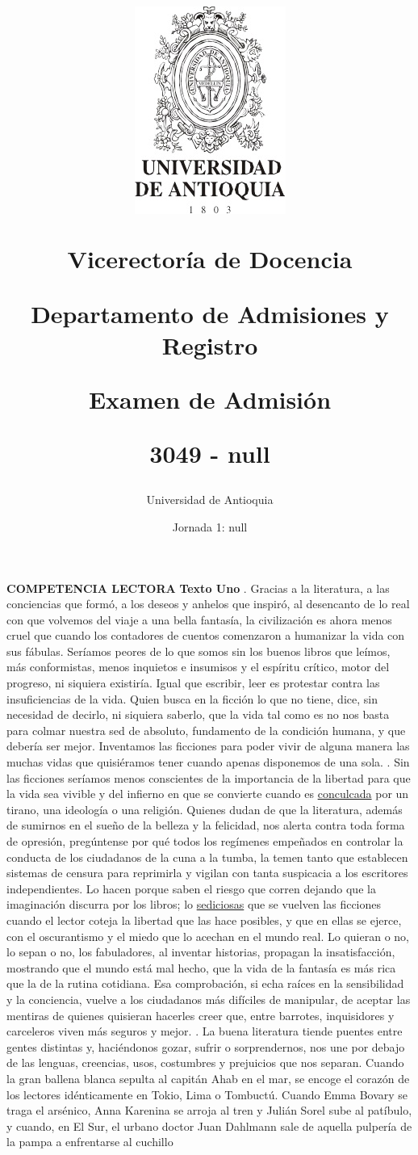 \documentclass[a4paper,12pt]{article}
\title{ 
\begin{minipage}{12cm} 
\centerline {\includegraphics{../../escudo.jpg}} 
\begin{center}Vicerector\'ia de Docencia\end{center}Departamento de Admisiones y Registro\newline\newline\newline\newline\centerline {Examen de Admisi\'on}\newline\newline\centerline {3049 - null}\author{Universidad de Antioquia}\date{Jornada 1:  null}\end{minipage}}
\begin{document}
\maketitle
\twocolumn 
\newpage \textbf{ COMPETENCIA LECTORA } \newline \textbf{ Texto Uno} . Gracias a la literatura, a las conciencias que formó, a los deseos y anhelos que inspiró, al desencanto de lo real con que volvemos del viaje a una bella fantasía, la civilización es ahora menos cruel que cuando los contadores de cuentos comenzaron a humanizar la vida con sus fábulas. Seríamos peores de lo que somos sin los buenos libros que leímos, más conformistas, menos inquietos e insumisos y el espíritu crítico, motor del progreso, ni siquiera existiría. Igual que escribir, leer es protestar contra las insuficiencias de la vida. Quien busca en la ficción lo que no tiene, dice, sin necesidad de decirlo, ni siquiera saberlo, que la vida tal como es no nos basta para colmar nuestra sed de absoluto, fundamento de la condición humana, y que debería ser mejor. Inventamos las ficciones para poder vivir de alguna manera las muchas vidas que quisiéramos tener cuando apenas disponemos de una sola. . Sin las ficciones seríamos menos conscientes de la importancia de la libertad para que la vida sea vivible y del infierno en que se convierte cuando es \underline{ conculcada}  por un tirano, una ideología o una religión. Quienes dudan de que la literatura, además de sumirnos en el sueño de la belleza y la felicidad, nos alerta contra toda forma de opresión, pregúntense por qué todos los regímenes empeñados en controlar la conducta de los ciudadanos de la cuna a la tumba, la temen tanto que establecen sistemas de censura para reprimirla y vigilan con tanta suspicacia a los escritores independientes. Lo hacen porque saben el riesgo que corren dejando que la imaginación discurra por los libros; lo \underline{ sediciosas}  que se vuelven las ficciones cuando el lector coteja la libertad que las hace posibles, y que en ellas se ejerce, con el oscurantismo y el miedo que lo acechan en el mundo real. Lo quieran o no, lo sepan o no, los fabuladores, al inventar historias, propagan la insatisfacción, mostrando que el mundo está mal hecho, que la vida de la fantasía es más rica que la de la rutina cotidiana. Esa comprobación, si echa raíces en la sensibilidad y la conciencia, vuelve a los ciudadanos más difíciles de manipular, de aceptar las mentiras de quienes quisieran hacerles creer que, entre barrotes, inquisidores y carceleros viven más seguros y mejor. . La buena literatura tiende puentes entre gentes distintas y, haciéndonos gozar, sufrir o sorprendernos, nos une por debajo de las lenguas, creencias, usos, costumbres y prejuicios que nos separan. Cuando la gran ballena blanca sepulta al capitán Ahab en el mar, se encoge el corazón de los lectores idénticamente en Tokio, Lima o Tombuctú. Cuando Emma Bovary se traga el arsénico, Anna Karenina se arroja al tren y Julián Sorel sube al patíbulo, y cuando, en El Sur, el urbano doctor Juan Dahlmann sale de aquella pulpería de la pampa a enfrentarse al cuchillo 
\end{document}
